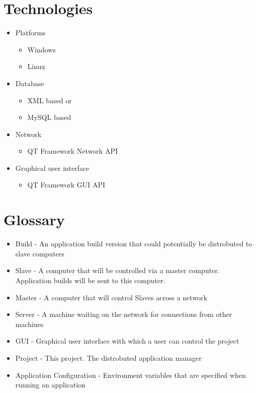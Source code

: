 \documentclass[a4paper,12pt,final]{article}
\begin{document}
\section{Technologies}

\begin{itemize}

\item{Platforms}
\begin{itemize}
\item{Windows}
\item{Linux}
\end{itemize}


\item{Database}
\begin{itemize}
\item{XML based or}
\item{MySQL based}
\end{itemize}


\item{Network}
\begin{itemize}
\item{QT Framework Network API}
\end{itemize}


\item{Graphical user interface}
\begin{itemize}
\item{QT Framework GUI API}
\end{itemize}

\end{itemize}


\section{Glossary}
\begin{itemize}
\item{Build - An application build version that could potentially be distrobuted to slave computers}
\item{Slave - A computer that will be controlled via a master computer. Application builds will be sent to this computer.}
\item{Master - A computer that will control Slaves across a network}
\item{Server - A machine waiting on the network for connections from other machines}
\item{GUI - Graphical user interface with which a user can control the project}
\item{Project - This project. The distrobuted application manager}
\item{Application Configuration - Environment variables that are specified when running an application}
\end{itemize}
\end{document}
